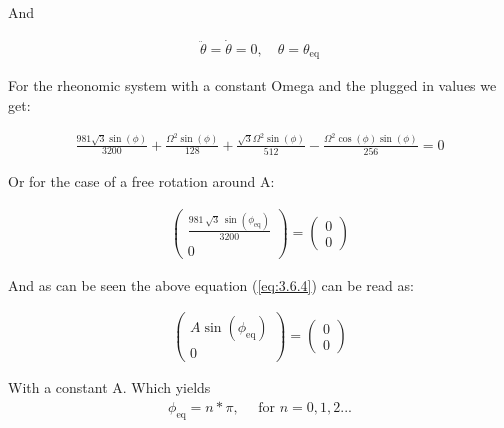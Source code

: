 And

\begin{equation}
    \begin{split}
        \ddot \theta = \dot \theta = 0, \quad \theta = \theta_\text{eq}
    \end{split}
\end{equation}

For the rheonomic system with a constant Omega and the plugged in values we get:

\begin{equation}\label{eq:3.6.3}
    \begin{split}
        \frac{981\sqrt{3}\sin\left(\phi \right)}{3200}+\frac{\Omega ^2\sin\left(\phi \right)}{128}+\frac{\sqrt{3}\Omega ^2\sin\left(\phi \right)}{512}-\frac{\Omega ^2\cos\left(\phi \right)\sin\left(\phi \right)}{256} = 0
    \end{split}
\end{equation}

Or for the case of a free rotation around A:

\begin{equation}\label{eq:3.6.4}
    \begin{split}
        \left(\begin{array}{c} \frac{981\,\sqrt{3}\,\sin\left(\phi _{\mathrm{eq}}\right)}{3200}\\ 0 \end{array}\right) = \left(\begin{array}{c}0\\ 0 \end{array}\right)
    \end{split}
\end{equation}

And as can be seen the above equation (\ref{eq:3.6.4}) can be read as:

\begin{equation}\label{eq:3.6.5}
    \begin{split}
        \begin{pmatrix}
            A\sin(\phi_{\text{eq}})\\0
        \end{pmatrix} = \begin{pmatrix}
            0\\0
        \end{pmatrix}
    \end{split}
\end{equation}

With a constant A. Which yields 
\begin{equation}
    \begin{split}
        \phi_{\text{eq}} = n*\pi, \quad \text{ for } n = 0,1,2...
    \end{split}
\end{equation}

